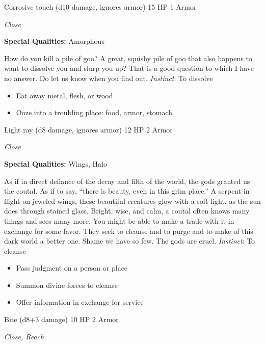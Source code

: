 \HRule
{}

Corrosive touch (d10 damage, ignores armor)\hspace*{\fill} 15 HP 1 Armor

\emph{Close}

\textbf{Special Qualities:}
Amorphous

\HRule
How do you kill a pile of goo? A great, squishy pile of goo that also happens to want to dissolve you and slurp you up? That is a good question to which I have no answer. Do let us know when you find out. \emph{Instinct}: To dissolve
\begin{itemize}
\item Eat away metal, flesh, or wood
\item Ooze into a troubling place: food, armor, stomach
\end{itemize}

\HRule
{}

Light ray (d8 damage, ignores armor)\hspace*{\fill} 12 HP 2 Armor

\emph{Close}

\textbf{Special Qualities:}
Wings, Halo

\HRule
As if in direct defiance of the decay and filth of the world, the gods granted us the coutal. As if to say, ``there is beauty, even in this grim place.'' A serpent in flight on jeweled wings, these beautiful creatures glow with a soft light, as the sun does through stained glass. Bright, wise, and calm, a coutal often knows many things and sees many more. You might be able to make a trade with it in exchange for some favor. They seek to cleanse and to purge and to make of this dark world a better one. Shame we have so few. The gods are cruel. \emph{Instinct}: To cleanse
\begin{itemize}
\item Pass judgment on a person or place
\item Summon divine forces to cleanse
\item Offer information in exchange for service
\end{itemize}
\newpage
\HRule
{}

Bite (d8+3 damage)\hspace*{\fill} 10 HP 2 Armor

\emph{Close, Reach}

